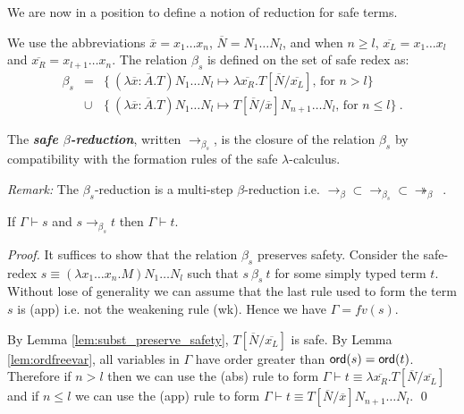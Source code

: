 \documentclass{llncs}
\newcommand\defname[1]{{\bf\em #1}\index{#1}}
\newcommand\betared{\rightarrow_\beta}
\newcommand\betasred{\rightarrow_{\beta_s}}
\newcommand\betaredtr{\twoheadrightarrow_\beta} %
\newcommand\subst[2]{\left[ #1/#2 \right]}
\newcommand\ord[1]{{\sf ord}(#1)}
\begin{document}
We are now in a position to define a notion of reduction for safe terms.

\begin{definition}
\label{dfn:safereduction} We use the
abbreviations $\overline{x} = x_1 \ldots x_n$,
$\overline{N} = N_1 \ldots N_l$, and when $n\geq l$, $\overline{x_L}
= x_1 \ldots x_l$ and $\overline{x_R} = x_{l+1} \ldots x_n$.
The relation $\beta_s$ is defined on the set of safe redex as:
\begin{eqnarray*}
\beta_s &=&
\{  \ (\lambda \overline{x} : \overline{A} . T) N_1 \ldots N_l \mapsto \lambda \overline{x_R}. T\subst{\overline{N}}{\overline{x_L}} \mbox{, for $n> l$}
\} \\
&\cup&
\{ \ (\lambda \overline{x} : \overline{A} . T) N_1 \ldots N_l \mapsto T\subst{\overline{N}}{\overline{x}} N_{n+1} \ldots N_l
\mbox{, for $n\leq l$} \} \ .
\end{eqnarray*}

The \defname{safe $\beta$-reduction}, written $\betasred$, is the closure of
the relation $\beta_s$ by compatibility with the formation rules of
the safe $\lambda$-calculus.
\end{definition}

\noindent \emph{Remark:} The $\beta_s$-reduction is a multi-step $\beta$-reduction i.e. $\betared \subset \betasred \subset \betaredtr$\ .


\begin{lemma}
\label{lem:safered_preserve_safety}
If $\Gamma \vdash s$ and $s \betasred t$ then $\Gamma \vdash t$.
\end{lemma}

\begin{proof}
It suffices to show that the relation $\beta_s$ preserves safety.
Consider the safe-redex $ s \equiv (\lambda x_1 \ldots x_n . M) N_1 \ldots N_l $ such that
$s\ \beta_s\ t$ for some simply typed term $t$.
Without lose of generality we can assume that the last rule used to form the term $s$ is {\sf(app)} i.e. not the weakening rule
{\sf(wk)}. Hence we have $\Gamma = fv(s)$.

By Lemma \ref{lem:subst_preserve_safety}, $T\subst{\overline{N}}{\overline{x_L}}$ is safe.
By Lemma \ref{lem:ordfreevar}, all variables in $\Gamma$ have order greater than $\ord{s} = \ord{t}$. Therefore
if $n>l$ then we can use the {\sf(abs)} rule to form $\Gamma \vdash t \equiv \lambda \overline{x_R}. T\subst{\overline{N}}{\overline{x_L}}$
and if $n \leq l$ we can use the {\sf(app)} rule to form $\Gamma \vdash t \equiv  T\subst{\overline{N}}{\overline{x}} N_{n+1} \ldots N_l$.
\qed
\end{proof}
\end{document}
